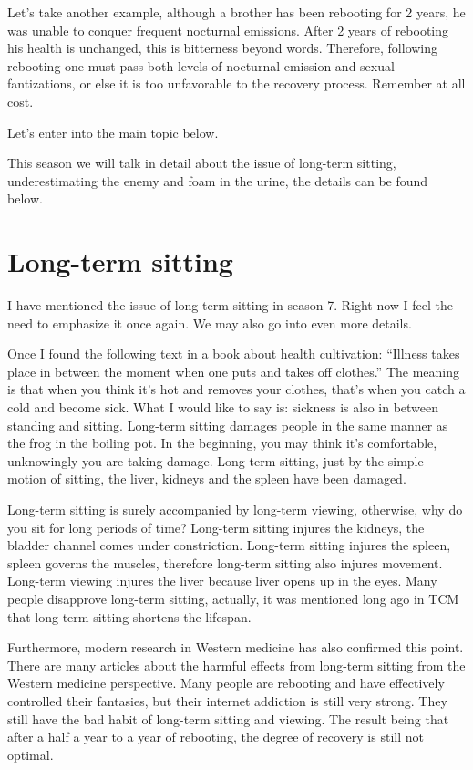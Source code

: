 \documentclass[
]{book}
\begin{document}
Let's take another example, although a brother has been rebooting for 2 years, he was unable to conquer frequent nocturnal emissions. After 2 years of rebooting his health is unchanged, this is bitterness beyond words. Therefore, following rebooting one must pass both levels of nocturnal emission and sexual fantizations, or else it is too unfavorable to the recovery process. Remember at all cost.

Let's enter into the main topic below.

This season we will talk in detail about the issue of long-term sitting, underestimating the enemy and foam in the urine, the details can be found below.

\hypertarget{long-term-sitting}{%
\section{Long-term sitting}\label{long-term-sitting}}

I have mentioned the issue of long-term sitting in season 7. Right now I feel the need to emphasize it once again. We may also go into even more details.

Once I found the following text in a book about health cultivation: ``Illness takes place in between the moment when one puts and takes off clothes.'' The meaning is that when you think it's hot and removes your clothes, that's when you catch a cold and become sick. What I would like to say is: sickness is also in between standing and sitting. Long-term sitting damages people in the same manner as the frog in the boiling pot. In the beginning, you may think it's comfortable, unknowingly you are taking damage. Long-term sitting, just by the simple motion of sitting, the liver, kidneys and the spleen have been damaged.

Long-term sitting is surely accompanied by long-term viewing, otherwise, why do you sit for long periods of time? Long-term sitting injures the kidneys, the bladder channel comes under constriction. Long-term sitting injures the spleen, spleen governs the muscles, therefore long-term sitting also injures movement. Long-term viewing injures the liver because liver opens up in the eyes. Many people disapprove long-term sitting, actually, it was mentioned long ago in TCM that long-term sitting shortens the lifespan.

Furthermore, modern research in Western medicine has also confirmed this point. There are many articles about the harmful effects from long-term sitting from the Western medicine perspective. Many people are rebooting and have effectively controlled their fantasies, but their internet addiction is still very strong. They still have the bad habit of long-term sitting and viewing. The result being that after a half a year to a year of rebooting, the degree of recovery is still not optimal.
\end{document}
